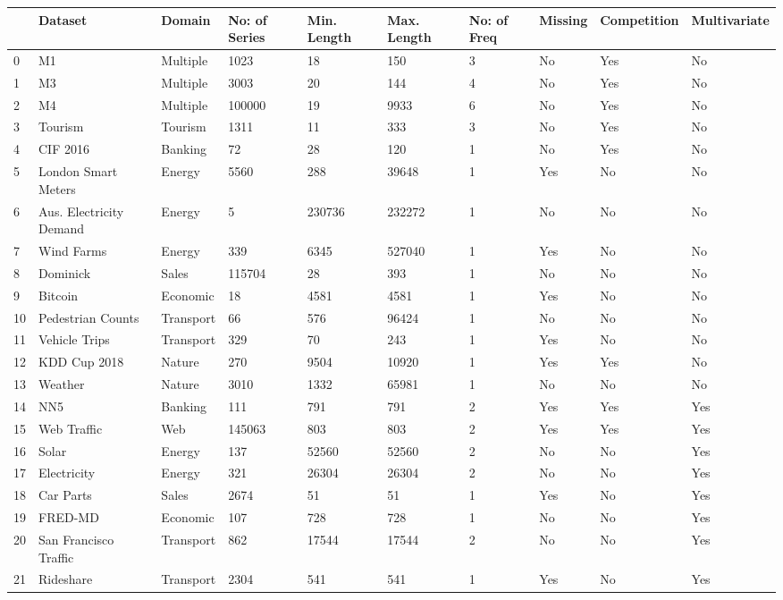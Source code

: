 \begin{tabular}{llllllllll}
\toprule
 & Dataset & Domain & No: of Series & Min. Length & Max. Length & No: of Freq & Missing & Competition & Multivariate \\
\midrule
0 & M1 & Multiple & 1023 & 18 & 150 & 3 & No & Yes & No \\
1 & M3 & Multiple & 3003 & 20 & 144 & 4 & No & Yes & No \\
2 & M4 & Multiple & 100000 & 19 & 9933 & 6 & No & Yes & No \\
3 & Tourism & Tourism & 1311 & 11 & 333 & 3 & No & Yes & No \\
4 & CIF 2016 & Banking & 72 & 28 & 120 & 1 & No & Yes & No \\
5 & London Smart Meters & Energy & 5560 & 288 & 39648 & 1 & Yes & No & No \\
6 & Aus. Electricity Demand & Energy & 5 & 230736 & 232272 & 1 & No & No & No \\
7 & Wind Farms & Energy & 339 & 6345 & 527040 & 1 & Yes & No & No \\
8 & Dominick & Sales & 115704 & 28 & 393 & 1 & No & No & No \\
9 & Bitcoin & Economic & 18 & 4581 & 4581 & 1 & Yes & No & No \\
10 & Pedestrian Counts & Transport & 66 & 576 & 96424 & 1 & No & No & No \\
11 & Vehicle Trips & Transport & 329 & 70 & 243 & 1 & Yes & No & No \\
12 & KDD Cup 2018 & Nature & 270 & 9504 & 10920 & 1 & Yes & Yes & No \\
13 & Weather & Nature & 3010 & 1332 & 65981 & 1 & No & No & No \\
14 & NN5 & Banking & 111 & 791 & 791 & 2 & Yes & Yes & Yes \\
15 & Web Traffic & Web & 145063 & 803 & 803 & 2 & Yes & Yes & Yes \\
16 & Solar & Energy & 137 & 52560 & 52560 & 2 & No & No & Yes \\
17 & Electricity & Energy & 321 & 26304 & 26304 & 2 & No & No & Yes \\
18 & Car Parts & Sales & 2674 & 51 & 51 & 1 & Yes & No & Yes \\
19 & FRED-MD & Economic & 107 & 728 & 728 & 1 & No & No & Yes \\
20 & San Francisco Traffic & Transport & 862 & 17544 & 17544 & 2 & No & No & Yes \\
21 & Rideshare & Transport & 2304 & 541 & 541 & 1 & Yes & No & Yes \\

\end{tabular}
